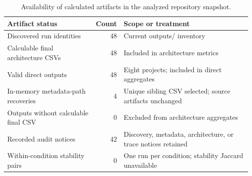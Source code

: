 \begin{table}[t]
\centering
\small
\begin{tabular}{lrl}
\toprule
Artifact status & Count & Scope or treatment \\
\midrule
Discovered run identities & 48 & Current outputs/ inventory \\
Calculable final architecture CSVs & 48 & Included in architecture metrics \\
Valid direct outputs & 48 & Eight projects; included in direct aggregates \\
In-memory metadata-path recoveries & 4 & Unique sibling CSV selected; source artifacts unchanged \\
Outputs without calculable final CSV & 0 & Excluded from architecture aggregates \\
Recorded audit notices & 42 & Discovery, metadata, architecture, or trace notices retained \\
Within-condition stability pairs & 0 & One run per condition; stability Jaccard unavailable \\
\bottomrule
\end{tabular}
\caption{Availability of calculated artifacts in the analyzed repository snapshot.}
\label{tab:result-availability}
\end{table}
